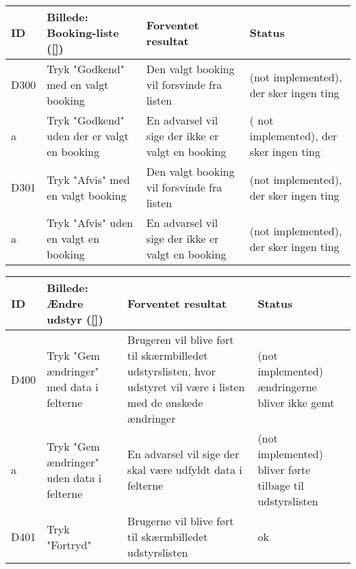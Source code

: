\begin{tabular}{ |p{1cm}| p{5cm} | p{4cm} | p{1cm} | }
\hline
ID & Billede: Booking-liste (\ref{})  & Forventet resultat & Status\\ 
\hline
D300 & Tryk "Godkend" med en valgt booking & Den valgt booking vil forsvinde fra listen & (not implemented), der sker ingen ting \\
\hline
a & Tryk "Godkend" uden der er valgt en booking & En advarsel vil sige der ikke er valgt en booking &( not implemented), der sker ingen ting \\
\hline
D301 & Tryk "Afvis" med en valgt booking & Den valgt booking vil forsvinde fra listen & (not implemented), der sker ingen ting \\
\hline
a & Tryk "Afvis" uden en valgt en booking & En advarsel vil sige der ikke er valgt en booking & (not implemented), der sker ingen ting \\
\hline
\end{tabular}

\begin{tabular}{ |p{1cm}| p{5cm} | p{4cm} | p{1cm} | }
\hline
ID & Billede: Ændre udstyr (\ref{}) & Forventet resultat & Status\\ 
\hline
D400 & Tryk "Gem ændringer" med data i felterne & Brugeren vil blive ført til skærmbilledet udstyrslisten, hvor udstyret vil være i listen med de ønskede ændringer &(not implemented) ændringerne bliver ikke gemt \\
\hline
a & Tryk "Gem ændringer" uden data i felterne & En advarsel vil sige der skal være udfyldt data i felterne &(not implemented) bliver førte tilbage til udstyrslisten \\
\hline
D401 & Tryk "Fortryd" & Brugerne vil blive ført til skærmbilledet udstyrslisten & ok \\
\hline
\end{tabular}

